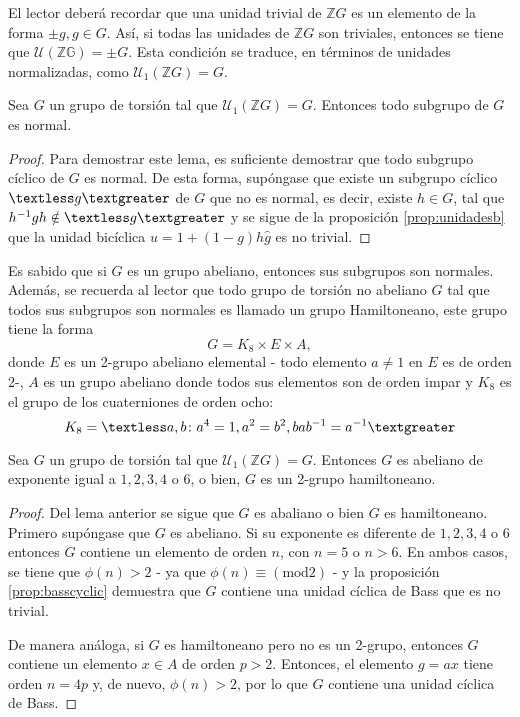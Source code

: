 El lector deberá recordar que una unidad trivial de $\mathds{Z}G$ es un elemento de la forma $\pm g, g \in G$. Así, si todas las unidades de $\mathds{Z}G$ son triviales, entonces se tiene que $\mathcal{U}(\mathds{ZG}) = \pm G$. Esta condición se traduce, en términos de unidades normalizadas, como $\mathcal{U}_1(\mathds{Z}G) = G.$
\begin{lema}
Sea $G$ un grupo de torsión tal que $\mathcal{U}_1(\mathds{Z}G) = G.$ Entonces todo subgrupo de $G$ es normal. 
\end{lema}
\begin{proof}
Para demostrar este lema, es suficiente demostrar que todo subgrupo cíclico de $G$ es normal.  De esta forma, supóngase que existe un subgrupo cíclico $\textless g \textgreater$ de $G$ que no es normal, es decir, existe $h \in G$, tal que $h^{-1}gh \notin \textless g \textgreater$ y se sigue de la proposición \ref{prop:unidadesb} que la unidad bicíclica $u = 1 + (1-g)h\hat{g}$ es no trivial. 
\end{proof}
Es sabido que si $G$ es un grupo abeliano, entonces sus subgrupos son normales. Además, se recuerda al lector que todo grupo de torsión no abeliano $G$ tal que todos sus subgrupos son normales es llamado un grupo Hamiltoneano, este grupo tiene la forma \[ G = K_8\times E \times A,\] donde $E$ es un 2-grupo abeliano elemental - todo elemento $a \neq 1$ en $E$ es de orden 2-, $A$ es un grupo abeliano donde todos sus elementos son de orden impar y $K_8$ es el grupo de los cuaterniones de orden ocho: \[ K_8 = \textless a,b \colon a^4 =1 , a^2 = b^2, bab^{-1} = a^{-1} \textgreater \]
\begin{proposicion}
Sea $G$ un grupo de torsión tal que $\mathcal{U}_1(\mathds{Z}G) = G$. Entonces $G$ es abeliano de exponente igual a $1,2,3,4$ o $6$, o bien, $G$ es un 2-grupo hamiltoneano.
\end{proposicion}
\begin{proof}
Del lema anterior se sigue que $G$ es abaliano o bien  $G$ es hamiltoneano. Primero supóngase que $G$ es abeliano. Si su exponente es diferente de $1,2,3,4$ o $6$ entonces $G$ contiene un elemento de orden $n$, con $n = 5$ o $n>6$. En ambos casos, se tiene que $\phi(n) > 2$ - ya que $\phi(n) \equiv (\mbox{mod} 2)$ -  y la proposición \ref{prop:basscyclic} demuestra que $G$ contiene una unidad cíclica de Bass que es no trivial.

De manera análoga, si $G$ es hamiltoneano pero no es un 2-grupo, entonces $G$ contiene un elemento $x \in A$ de orden $p>2$. Entonces, el elemento $g = ax$ tiene orden $n=4p$ y, de nuevo, $\phi(n) > 2$, por lo que $G$ contiene una unidad cíclica de Bass. 
\end{proof}
